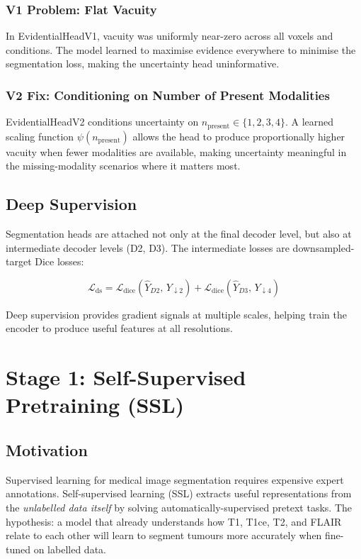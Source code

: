 \documentclass[12pt,a4paper]{article}
\begin{document}
\subsubsection{V1 Problem: Flat Vacuity}
In EvidentialHeadV1, vacuity was uniformly near-zero across all voxels and conditions. The model learned to maximise evidence everywhere to minimise the segmentation loss, making the uncertainty head uninformative.

\subsubsection{V2 Fix: Conditioning on Number of Present Modalities}
EvidentialHeadV2 conditions uncertainty on $n_{\text{present}} \in \{1,2,3,4\}$. A learned scaling function $\psi(n_{\text{present}})$ allows the head to produce proportionally higher vacuity when fewer modalities are available, making uncertainty meaningful in the missing-modality scenarios where it matters most.

\subsection{Deep Supervision}

Segmentation heads are attached not only at the final decoder level, but also at intermediate decoder levels (D2, D3). The intermediate losses are downsampled-target Dice losses:

\[
\mathcal{L}_{\text{ds}} = \mathcal{L}_{\text{dice}}(\hat{Y}_{D2},\, Y_{\downarrow 2}) + \mathcal{L}_{\text{dice}}(\hat{Y}_{D3},\, Y_{\downarrow 4})
\]

Deep supervision provides gradient signals at multiple scales, helping train the encoder to produce useful features at all resolutions.

\section{Stage 1: Self-Supervised Pretraining (SSL)}

\subsection{Motivation}

Supervised learning for medical image segmentation requires expensive expert annotations. Self-supervised learning (SSL) extracts useful representations from the \emph{unlabelled data itself} by solving automatically-supervised pretext tasks. The hypothesis: a model that already understands how T1, T1ce, T2, and FLAIR relate to each other will learn to segment tumours more accurately when fine-tuned on labelled data.
\end{document}
